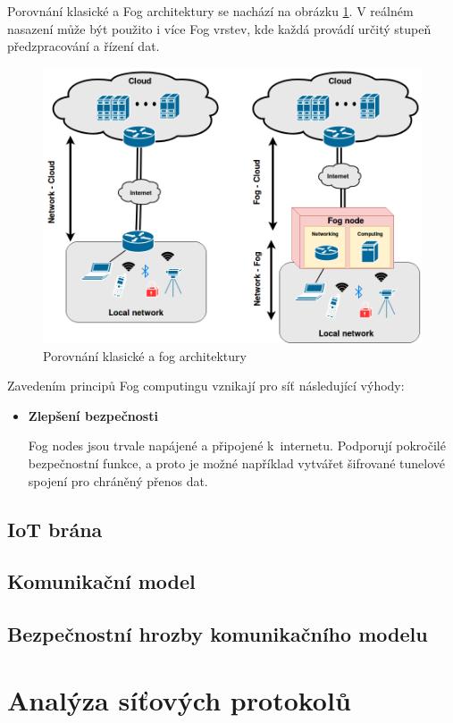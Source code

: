  Porovnání klasické a Fog architektury se nachází na obrázku \ref{obr.fog}. V reálném nasazení může
 být použito i více Fog vrstev, kde každá provádí určitý stupeň předzpracování a řízení
 dat.
\begin{figure}[ht]
\begin{center}
\includegraphics[scale=0.38]{pictures/fog}
\caption{Porovnání klasické a fog architektury}
\label{obr.fog}
\end{center}
\end{figure}
 Zavedením principů Fog computingu vznikají pro síť následující výhody:
 \begin{itemize}
 \item \textbf{Zlepšení bezpečnosti}
 
     Fog nodes jsou trvale napájené a připojené k internetu. Podporují pokročilé
     bezpečnostní funkce, a proto je možné například vytvářet šifrované tunelové
     spojení pro chráněný přenos dat.
 \end{itemize} 
 
 \subsection{IoT brána} 
 \subsection{Komunikační model}
 \subsection{Bezpečnostní hrozby komunikačního modelu}
 \section{Analýza síťových protokolů}
